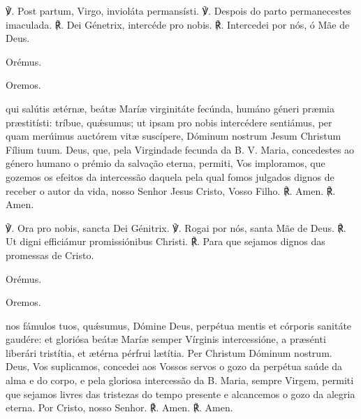 \pagebreak[3]\begin{nscenter}\emph{}\end{nscenter}

\begin{paracol}{2}
℣. Post partum, Virgo, invioláta permansísti.
\switchcolumn
℣. Despois do parto permanecestes imaculada.
\switchcolumn*
℟. Dei Génetrix, intercéde pro nobis.
\switchcolumn
℟. Intercedei por nós, ó Mãe de Deus.
\switchcolumn*
\begin{nscenter} {\redx Orémus.} \end{nscenter}
\switchcolumn
\begin{nscenter} {\redx Oremos.} \end{nscenter}
\switchcolumn*
{} qui salútis ætérnæ, beátæ Maríæ virginitáte fecúnda, humáno géneri præmia præstitísti: tríbue, quǽsumus; ut ipsam pro nobis intercédere sentiámus, per quam merúimus auctórem vitæ suscípere, Dóminum nostrum Jesum Christum Fílium tuum.
\switchcolumn
{} Deus, que, pela Virgindade fecunda da B. V. Maria, concedestes ao género humano o prémio da salvação eterna, permiti, Vos imploramos, que gozemos os efeitos da intercessão daquela pela qual fomos julgados dignos de receber o autor da vida, nosso Senhor Jesus Cristo, Vosso Filho.
\switchcolumn*
℟. Amen.
\switchcolumn
℟. Amen.
\end{paracol}

\begin{nscenter}\emph{}\end{nscenter}

\begin{paracol}{2}
℣. Ora pro nobis, sancta Dei Génitrix.
\switchcolumn
℣. Rogai por nós, santa Mãe de Deus.
\switchcolumn*
℟. Ut digni efficiámur promissiónibus Christi.
\switchcolumn
℟. Para que sejamos dignos das promessas de Cristo.
\switchcolumn*
\begin{nscenter} {\redx Orémus.} \end{nscenter}
\switchcolumn
\begin{nscenter} {\redx Oremos.} \end{nscenter}
\switchcolumn*
{} nos fámulos tuos, quǽsumus, Dómine Deus, perpétua mentis et córporis sanitáte gaudére: et gloriósa beátæ Maríæ semper Vírginis intercessióne, a præsénti liberári tristítia, et ætérna pérfrui lætítia. Per Christum Dóminum nostrum.
\switchcolumn
{} Deus, Vos suplicamos, concedei aos Vossos servos o gozo da perpétua saúde da alma e do corpo, e pela gloriosa intercessão da B. Maria, sempre Virgem, permiti que sejamos livres das tristezas do tempo presente e alcancemos o gozo da alegria eterna. Por Cristo, nosso Senhor.
\switchcolumn*
℟. Amen.
\switchcolumn
℟. Amen.
\end{paracol}

